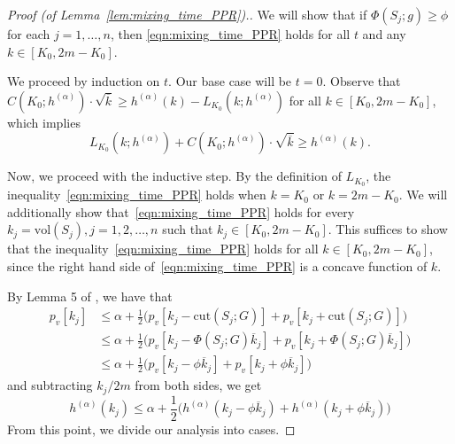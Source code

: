 \documentclass{article}
\newcommand{\vol}{\mathrm{vol}}
\newcommand{\1}{\mathbf{1}}
\theoremstyle{definition}
\theoremstyle{remark}
\begin{document}
\begin{proof}[Proof (of Lemma~\ref{lem:mixing_time_PPR}).]
	We will show that if $\Phi(S_j; g) \geq \phi$ for each $j = 1,\ldots,n$, then \eqref{eqn:mixing_time_PPR} holds for all $t$ and any $k \in [K_0,2m - K_0]$.
	
	We proceed by induction on $t$. Our base case will be $t = 0$. Observe that $C(K_0;h^{(\alpha)}) \cdot \sqrt{\overline{k}} \geq h^{(\alpha)}(k) - L_{K_0}(k;h^{(\alpha)})$ for all $k \in [K_0,2m - K_0]$, which implies
	\begin{equation*}
	L_{K_0}(k;h^{(\alpha)}) + C(K_0;h^{(\alpha)}) \cdot \sqrt{\overline{k}} \geq h^{(\alpha)}(k).
	\end{equation*}
	
	Now, we proceed with the inductive step. By the definition of $L_{K_0}$, the inequality~\eqref{eqn:mixing_time_PPR} holds when $k = K_0$ or $k = 2m - K_0$. We will additionally show that~\eqref{eqn:mixing_time_PPR} holds for every $k_j = \vol(S_j), j = 1,2,\ldots,n$ such that $k_j \in [K_0, 2m - K_0]$. This suffices to show that the inequality~\eqref{eqn:mixing_time_PPR} holds for all $k \in [K_0,2m - K_0]$, since the right hand side of~\eqref{eqn:mixing_time_PPR} is a concave function of $k$.
	
	By Lemma 5 of \citet{andersen2006}, we have that
	\begin{align}
	p_v[k_j] & \leq \alpha + \frac{1}{2} \bigl(p_v[k_j - \mathrm{cut}(S_j;G)] + p_v[k_j + \mathrm{cut}(S_j;G)] \bigr) \nonumber\\
	& \leq \alpha + \frac{1}{2} \bigl(p_v[k_j - \Phi(S_j;G) \overline{k}_j] + p_v[k_j + \Phi(S_j;G) \overline{k}_j]  \bigr) \nonumber \\
	& \leq \alpha + \frac{1}{2} \bigl(p_v[k_j - \phi \overline{k}_j] + p_v[k_j + \phi \overline{k}_j]\bigr) \nonumber
	\end{align}
	and subtracting $k_j/2m$ from both sides, we get
	\begin{equation}
	\label{eqn:mixing_time_PPR_pf1}
	h^{(\alpha)}(k_j) \leq \alpha + \frac{1}{2} \bigl(h^{(\alpha)}(k_j - \phi \overline{k}_j) + h^{(\alpha)}(k_j +  \phi \overline{k}_j) \bigr)
	\end{equation}
	From this point, we divide our analysis into cases. 
	

\end{proof}
\end{document}
